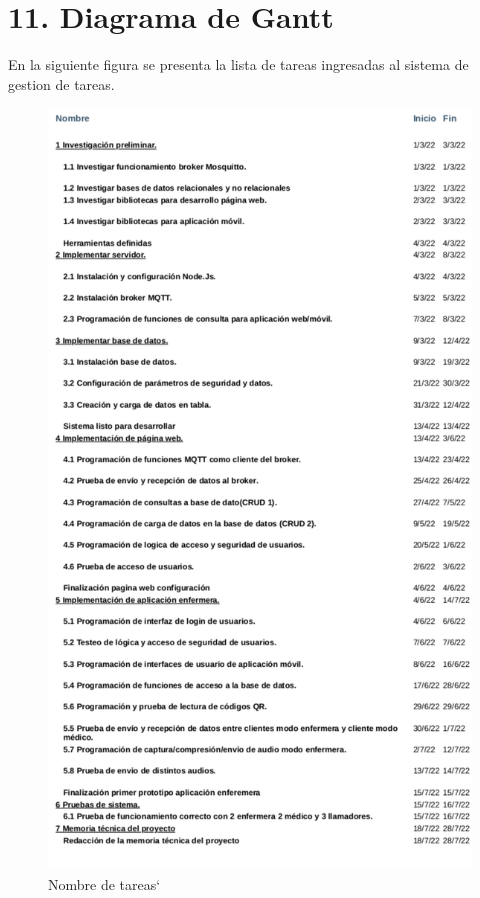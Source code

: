 \documentclass[
11pt, %
]{charter}
\begin{document}
\section{11. Diagrama de Gantt}
\label{sec:gantt}
En la siguiente figura se presenta la lista de tareas ingresadas al sistema de gestion de tareas.

\begin{figure}
\centering 
\includegraphics[height=.85\textheight]{./Figuras/Tareas-desc.pdf}
\caption{Nombre de tareas`}
\label{fig:diagGantt}
\end{figure}
\end{document}
